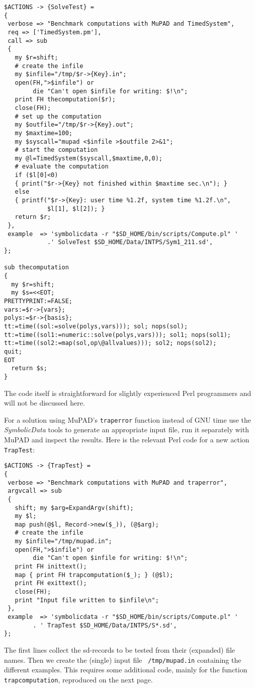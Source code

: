 \documentclass[11pt]{article}
\newcommand{\SD}{{\em Symbo\-lic\-Data}}
\begin{document}
\pagebreak

{\small\begin{verbatim}
$ACTIONS -> {SolveTest} =
{
 verbose => "Benchmark computations with MuPAD and TimedSystem",
 req => ['TimedSystem.pm'],
 call => sub 
 {
   my $r=shift;
   # create the infile
   my $infile="/tmp/$r->{Key}.in";
   open(FH,">$infile") or 
        die "Can't open $infile for writing: $!\n";
   print FH thecomputation($r);
   close(FH);
   # set up the computation
   my $outfile="/tmp/$r->{Key}.out";
   my $maxtime=100;
   my $syscall="mupad <$infile >$outfile 2>&1";
   # start the computation
   my @l=TimedSystem($syscall,$maxtime,0,0);
   # evaluate the computation
   if ($l[0]<0)
   { print("$r->{Key} not finished within $maxtime sec.\n"); }
   else
   { printf("$r->{Key}: user time %1.2f, system time %1.2f.\n", 
            $l[1], $l[2]); }
   return $r;
 },
 example  => 'symbolicdata -r "$SD_HOME/bin/scripts/Compute.pl" '
            .' SolveTest $SD_HOME/Data/INTPS/Sym1_211.sd',
};

sub thecomputation 
{
  my $r=shift;
  my $s=<<EOT;
PRETTYPRINT:=FALSE;
vars:=$r->{vars};
polys:=$r->{basis};
tt:=time((sol:=solve(polys,vars))); sol; nops(sol);
tt:=time((sol1:=numeric::solve(polys,vars))); sol1; nops(sol1);
tt:=time((sol2:=map(sol,op\@allvalues))); sol2; nops(sol2);
quit;
EOT
  return $s;
}
\end{verbatim}}
\pagebreak

The code itself is straightforward for slightly experienced Perl
programmers and will not be discussed here.
\medskip

For a solution using MuPAD's {\tt traperror} function instead of GNU
time use the {\SD} tools to generate an appropriate input file, run it
separately with MuPAD and inspect the results.  Here is the relevant
Perl code for a new action {\tt TrapTest}:
{\small\begin{verbatim}
$ACTIONS -> {TrapTest} =
{
 verbose => "Benchmark computations with MuPAD and traperror",
 argvcall => sub 
 {
   shift; my $arg=ExpandArgv(shift);   
   my $l;
   map push(@$l, Record->new($_)), (@$arg);
   # create the infile
   my $infile="/tmp/mupad.in";
   open(FH,">$infile") or 
        die "Can't open $infile for writing: $!\n";
   print FH inittext();
   map { print FH trapcomputation($_); } (@$l);
   print FH exittext();
   close(FH);
   print "Input file written to $infile\n";
 },
 example  => 'symbolicdata -r "$SD_HOME/bin/scripts/Compute.pl" '
        . ' TrapTest $SD_HOME/Data/INTPS/S*.sd',
};
\end{verbatim}}%
The first lines collect the sd-records to be tested from their
(expanded) file names. Then we create the (single) input file {\tt
/tmp/mupad.in} containing the different examples.  This requires some
additional code, mainly for the function {\tt trapcomputation},
reproduced on the next page.
\end{document}
